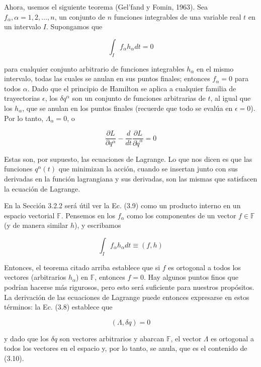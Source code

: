 Ahora, usemos el siguiente teorema (Gel'fand y Fomin, 1963). Sea $ f_{\alpha}, \alpha=1,2,\ldots,n $, un conjunto de $ n $ funciones integrables de una variable real $ t $ en un intervalo $ I $. Supongamos que


\begin{equation*}
\int_{I} f_{\alpha} h_{\alpha} d t=0 \tag{3.9}
\end{equation*}


para cualquier conjunto arbitrario de funciones integrables $ h_{\alpha} $ en el mismo intervalo, todas las cuales se anulan en sus puntos finales; entonces $ f_{\alpha}=0 $ para todos $ \alpha $. Dado que el principio de Hamilton se aplica a cualquier familia de trayectorias $ \epsilon $, los $ \delta q^{\alpha} $ son un conjunto de funciones arbitrarias de $ t $, al igual que los $ h_{\alpha} $, que se anulan en los puntos finales (recuerde que todo se evalúa en $ \epsilon=0 $). Por lo tanto, $ \Lambda_{\alpha}=0 $, o


\begin{equation*}
\frac{\partial L}{\partial q^{\alpha}}-\frac{d}{d t} \frac{\partial L}{\partial \dot{q}^{\alpha}}=0 \tag{3.10}
\end{equation*}


Estas son, por supuesto, las ecuaciones de Lagrange. Lo que nos dicen es que las funciones $ q^{\alpha}(t) $ que minimizan la acción, cuando se insertan junto con sus derivadas en la función lagrangiana y sus derivadas, son las mismas que satisfacen la ecuación de Lagrange.

En la Sección 3.2.2 será útil ver la Ec. (3.9) como un producto interno en un espacio vectorial $ \mathbb{F} $. Pensemos en los $ f_{\alpha} $ como los componentes de un vector $ f \in \mathbb{F} $ (y de manera similar $ h $), y escribamos

$$
\int_{I} f_{\alpha} h_{\alpha} d t \equiv(f, h)
$$

Entonces, el teorema citado arriba establece que si $ f $ es ortogonal a todos los vectores (arbitrarios $ h_{\alpha} $) en $ \mathbb{F} $, entonces $ f=0 $. Hay algunos puntos finos que podrían hacerse más rigurosos, pero esto será suficiente para nuestros propósitos. La derivación de las ecuaciones de Lagrange puede entonces expresarse en estos términos: la Ec. (3.8) establece que


\begin{equation*}
(\Lambda, \delta q)=0 \tag{3.11}
\end{equation*}


y dado que los $ \delta q $ son vectores arbitrarios y abarcan $ \mathbb{F} $, el vector $ \Lambda $ es ortogonal a todos los vectores en el espacio y, por lo tanto, se anula, que es el contenido de (3.10).
